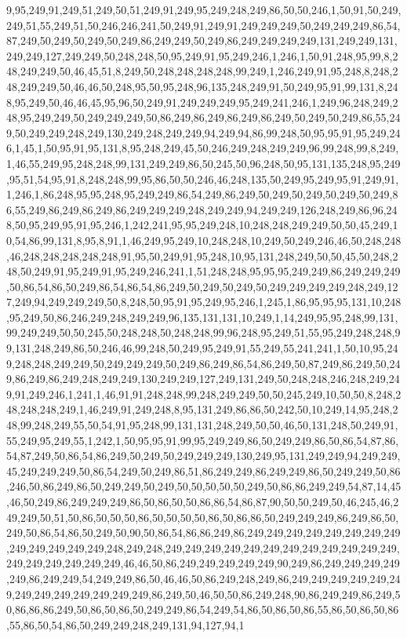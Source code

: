 9,95,249,91,249,51,249,50,51,249,91,249,95,249,248,249,86,50,50,246,1,50,91,50,249,249,51,55,249,51,50,246,246,241,50,249,91,249,91,249,249,249,50,249,249,249,86,54,87,249,50,249,50,249,50,249,86,249,249,50,249,86,249,249,249,249,131,249,249,131,249,249,127,249,249,50,248,248,50,95,249,91,95,249,246,1,246,1,50,91,248,95,99,8,248,249,249,50,46,45,51,8,249,50,248,248,248,248,99,249,1,246,249,91,95,248,8,248,248,249,249,50,46,46,50,248,95,50,95,248,96,135,248,249,91,50,249,95,91,99,131,8,248,95,249,50,46,46,45,95,96,50,249,91,249,249,249,95,249,241,246,1,249,96,248,249,248,95,249,249,50,249,249,249,50,86,249,86,249,86,249,86,249,50,249,50,249,86,55,249,50,249,249,248,249,130,249,248,249,249,94,249,94,86,99,248,50,95,95,91,95,249,246,1,45,1,50,95,91,95,131,8,95,248,249,45,50,246,249,248,249,249,96,99,248,99,8,249,1,46,55,249,95,248,248,99,131,249,249,86,50,245,50,96,248,50,95,131,135,248,95,249,95,51,54,95,91,8,248,248,99,95,86,50,50,246,46,248,135,50,249,95,249,95,91,249,91,1,246,1,86,248,95,95,248,95,249,249,86,54,249,86,249,50,249,50,249,50,249,50,249,86,55,249,86,249,86,249,86,249,249,249,248,249,249,94,249,249,126,248,249,86,96,248,50,95,249,95,91,95,246,1,242,241,95,95,249,248,10,248,248,249,249,50,50,45,249,10,54,86,99,131,8,95,8,91,1,46,249,95,249,10,248,248,10,249,50,249,246,46,50,248,248,46,248,248,248,248,248,91,95,50,249,91,95,248,10,95,131,248,249,50,50,45,50,248,248,50,249,91,95,249,91,95,249,246,241,1,51,248,248,95,95,95,249,249,86,249,249,249,50,86,54,86,50,249,86,54,86,54,86,249,50,249,50,249,50,249,249,249,249,248,249,127,249,94,249,249,249,50,8,248,50,95,91,95,249,95,246,1,245,1,86,95,95,95,131,10,248,95,249,50,86,246,249,248,249,249,96,135,131,131,10,249,1,14,249,95,95,248,99,131,99,249,249,50,50,245,50,248,248,50,248,248,99,96,248,95,249,51,55,95,249,248,248,99,131,248,249,86,50,246,46,99,248,50,249,95,249,91,55,249,55,241,241,1,50,10,95,249,248,248,249,249,50,249,249,249,50,249,86,249,86,54,86,249,50,87,249,86,249,50,249,86,249,86,249,248,249,249,130,249,249,127,249,131,249,50,248,248,246,248,249,249,91,249,246,1,241,1,46,91,91,248,248,99,248,249,249,50,50,245,249,10,50,50,8,248,248,248,248,249,1,46,249,91,249,248,8,95,131,249,86,86,50,242,50,10,249,14,95,248,248,99,248,249,55,50,54,91,95,248,99,131,131,248,249,50,50,46,50,131,248,50,249,91,55,249,95,249,55,1,242,1,50,95,95,91,99,95,249,249,86,50,249,249,86,50,86,54,87,86,54,87,249,50,86,54,86,249,50,249,50,249,249,249,130,249,95,131,249,249,94,249,249,45,249,249,249,50,86,54,249,50,249,86,51,86,249,249,86,249,249,86,50,249,249,50,86,246,50,86,249,86,50,249,249,50,249,50,50,50,50,50,249,50,86,86,249,249,54,87,14,45,46,50,249,86,249,249,249,86,50,86,50,50,86,86,54,86,87,90,50,50,249,50,46,245,46,249,249,50,51,50,86,50,50,50,86,50,50,50,50,86,50,86,86,50,249,249,249,86,249,86,50,249,50,86,54,86,50,249,50,90,50,86,54,86,86,249,86,249,249,249,249,249,249,249,249,249,249,249,249,249,248,249,248,249,249,249,249,249,249,249,249,249,249,249,249,249,249,249,249,249,249,46,46,50,86,249,249,249,249,249,90,249,86,249,249,249,249,249,86,249,249,54,249,249,86,50,46,46,50,86,249,248,249,86,249,249,249,249,249,249,249,249,249,249,249,249,249,86,249,50,46,50,50,86,249,248,90,86,249,249,86,249,50,86,86,86,249,50,86,50,86,50,249,249,86,54,249,54,86,50,86,50,86,55,86,50,86,50,86,55,86,50,54,86,50,249,249,248,249,131,94,127,94,1
